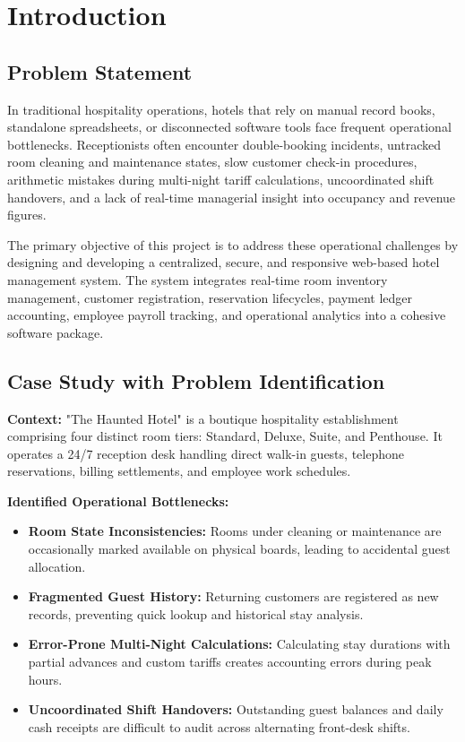 \documentclass[11pt,a4paper]{article}
\begin{document}
\section{Introduction}

\subsection{Problem Statement}
In traditional hospitality operations, hotels that rely on manual record books, standalone spreadsheets, or disconnected software tools face frequent operational bottlenecks. Receptionists often encounter double-booking incidents, untracked room cleaning and maintenance states, slow customer check-in procedures, arithmetic mistakes during multi-night tariff calculations, uncoordinated shift handovers, and a lack of real-time managerial insight into occupancy and revenue figures.

The primary objective of this project is to address these operational challenges by designing and developing a centralized, secure, and responsive web-based hotel management system. The system integrates real-time room inventory management, customer registration, reservation lifecycles, payment ledger accounting, employee payroll tracking, and operational analytics into a cohesive software package.

\subsection{Case Study with Problem Identification}
\textbf{Context:} "The Haunted Hotel" is a boutique hospitality establishment comprising four distinct room tiers: Standard, Deluxe, Suite, and Penthouse. It operates a 24/7 reception desk handling direct walk-in guests, telephone reservations, billing settlements, and employee work schedules.

\textbf{Identified Operational Bottlenecks:}
\begin{itemize}[leftmargin=*]
  \item \textbf{Room State Inconsistencies:} Rooms under cleaning or maintenance are occasionally marked available on physical boards, leading to accidental guest allocation.
  \item \textbf{Fragmented Guest History:} Returning customers are registered as new records, preventing quick lookup and historical stay analysis.
  \item \textbf{Error-Prone Multi-Night Calculations:} Calculating stay durations with partial advances and custom tariffs creates accounting errors during peak hours.
  \item \textbf{Uncoordinated Shift Handovers:} Outstanding guest balances and daily cash receipts are difficult to audit across alternating front-desk shifts.
\end{itemize}
\end{document}
